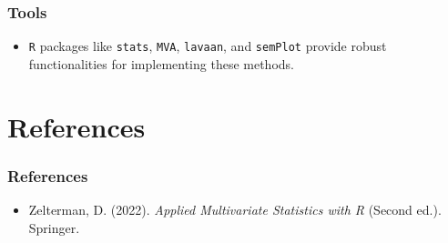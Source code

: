 \documentclass{beamer}
\newcommand{\code}[1]{\texttt{#1}}
\begin{document}
\begin{frame}
    \frametitle{Tools}
    \begin{itemize}
        \item \code{R} packages like \code{stats}, \code{MVA}, \code{lavaan}, and \code{semPlot} provide robust functionalities for implementing these methods.
    \end{itemize}
\end{frame}

\section*{References}
\begin{frame}
    \frametitle{References}
    \begin{itemize}
        \item Zelterman, D. (2022). \textit{Applied Multivariate Statistics with R} (Second ed.). Springer.
    \end{itemize}
\end{frame}
\end{document}
